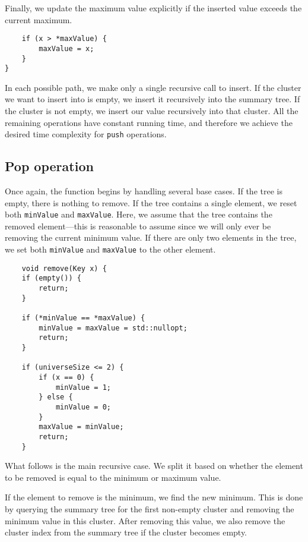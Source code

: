 Finally, we update the maximum value explicitly if the inserted value exceeds the current maximum.

\begin{verbatim}
    if (x > *maxValue) {
        maxValue = x;
    }
}
\end{verbatim}

In each possible path, we make only a single recursive call to insert. If the cluster we want to insert into is empty, we insert it recursively into the summary tree. If the cluster is not empty, we insert our value recursively into that cluster. All the remaining operations have constant running time, and therefore we achieve the desired time complexity for \texttt{push} operations.

\subsection{Pop operation}

Once again, the function begins by handling several base cases. If the tree is empty, there is nothing to remove. If the tree contains a single element, we reset both \texttt{minValue} and \texttt{maxValue}. Here, we assume that the tree contains the removed element—this is reasonable to assume since we will only ever be removing the current minimum value. If there are only two elements in the tree, we set both \texttt{minValue} and \texttt{maxValue} to the other element.

\begin{verbatim}
    void remove(Key x) {
    if (empty()) {
        return;
    }

    if (*minValue == *maxValue) {
        minValue = maxValue = std::nullopt;
        return;
    }

    if (universeSize <= 2) {
        if (x == 0) {
            minValue = 1;
        } else {
            minValue = 0;
        }
        maxValue = minValue;
        return;
    }
\end{verbatim}

What follows is the main recursive case. We split it based on whether the element to be removed is equal to the minimum or maximum value.

If the element to remove is the minimum, we find the new minimum. This is done by querying the summary tree for the first non-empty cluster and removing the minimum value in this cluster. After removing this value, we also remove the cluster index from the summary tree if the cluster becomes empty.

